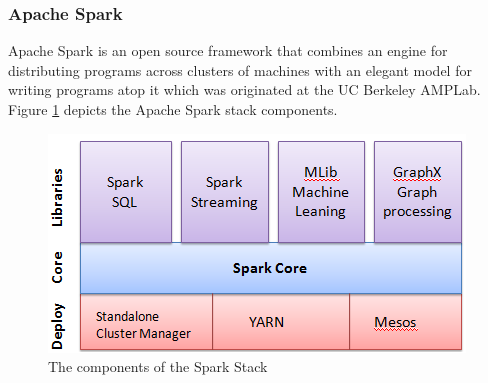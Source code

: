 \begin{itemize}
\begin{description}
\end{description}





\end{itemize}



\subsubsection{Apache Spark}
Apache Spark is an open source framework that combines an engine for distributing programs across clusters of machines with an elegant model for writing programs atop it which was originated at the UC Berkeley AMPLab\cite{a:Spark1}. \\
Figure \ref{stack} depicts the Apache Spark stack components. 
				\begin{figure}[h!]
					\centering
					\includegraphics[scale=0.9]{graphics/sparkStack.PNG} 
					\caption{The components of the Spark Stack} \label{stack} 
				\end{figure}

